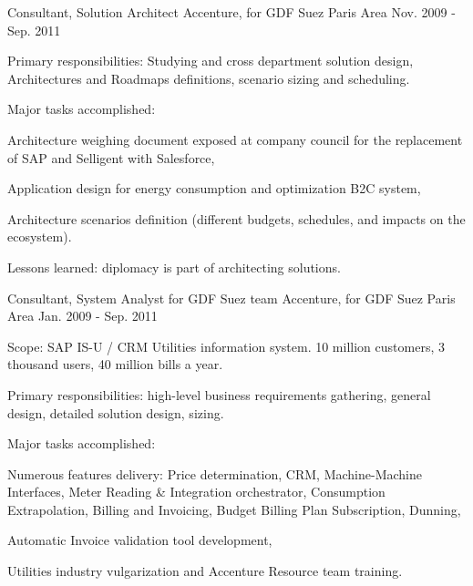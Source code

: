 \begin{cventries}
  \cventry
    {Consultant, Solution Architect} %
    {Accenture, for GDF Suez} %
    {Paris Area} %
    {Nov. 2009 - Sep. 2011} %
    {
      \begin{cvitems} %
        \item {Primary responsibilities: Studying and cross department solution design, Architectures and Roadmaps definitions, scenario sizing and scheduling.}
        \item {Major tasks accomplished:}
        \begin{cvsubitems}
          \item {Architecture weighing document exposed at company council for the replacement of SAP and Selligent with Salesforce,}
          \item {Application design for energy consumption and optimization B2C system,}
          \item {Architecture scenarios definition (different budgets, schedules, and impacts on the ecosystem).}
        \end{cvsubitems}
        \item {Lessons learned: diplomacy is part of architecting solutions.}
      \end{cvitems}
    }

  \cventry
    {Consultant, System Analyst for GDF Suez team} %
    {Accenture, for GDF Suez} %
    {Paris Area} %
    {Jan. 2009 - Sep. 2011} %
    {
      \begin{cvitems} %
        \item {Scope: SAP IS-U / CRM Utilities information system. 10 million customers, 3 thousand users, 40 million bills a year.}
        \item {Primary responsibilities: high-level business requirements gathering, general design, detailed solution design, sizing.}
        \item {Major tasks accomplished:}
        \begin{cvsubitems}
          \item {Numerous features delivery: Price determination, CRM, Machine-Machine Interfaces, Meter Reading \& Integration orchestrator, Consumption Extrapolation, Billing and Invoicing, Budget Billing Plan Subscription, Dunning,}
          \item {Automatic Invoice validation tool development,}
          \item {Utilities industry vulgarization and Accenture Resource team training.}
        \end{cvsubitems}
      \end{cvitems}
    }


\end{cventries}

